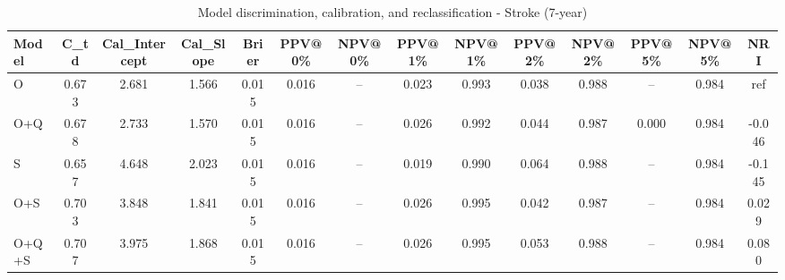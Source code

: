 \begin{table}[htbp]
\centering
\small
\caption{Model discrimination, calibration, and reclassification - Stroke (7-year)}
\label{tab:perf_stroke_7y}
\begin{tabular}{lccccccccccccc}
\toprule
Model & C\_td & Cal\_Intercept & Cal\_Slope & Brier & PPV@0\% & NPV@0\% & PPV@1\% & NPV@1\% & PPV@2\% & NPV@2\% & PPV@5\% & NPV@5\% & NRI \\
\midrule
O & 0.673 & 2.681 & 1.566 & 0.015 & 0.016 & -- & 0.023 & 0.993 & 0.038 & 0.988 & -- & 0.984 & ref \\
O+Q & 0.678 & 2.733 & 1.570 & 0.015 & 0.016 & -- & 0.026 & 0.992 & 0.044 & 0.987 & 0.000 & 0.984 & -0.046 \\
S & 0.657 & 4.648 & 2.023 & 0.015 & 0.016 & -- & 0.019 & 0.990 & 0.064 & 0.988 & -- & 0.984 & -0.145 \\
O+S & 0.703 & 3.848 & 1.841 & 0.015 & 0.016 & -- & 0.026 & 0.995 & 0.042 & 0.987 & -- & 0.984 & 0.029 \\
O+Q+S & 0.707 & 3.975 & 1.868 & 0.015 & 0.016 & -- & 0.026 & 0.995 & 0.053 & 0.988 & -- & 0.984 & 0.080 \\
\bottomrule
\end{tabular}
\end{table}